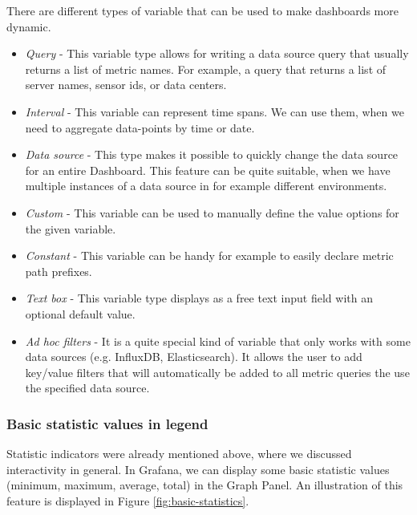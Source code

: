 
There are different types of variable that can be used to make dashboards more dynamic.
\begin{itemize}
	\item \emph{Query} - This variable type allows for writing a data source query that usually returns a list of metric names. For example, a query that returns a list of server names, sensor ids, or data centers.
	\item \emph{Interval} - This variable can represent time spans. We can use them, when we need to aggregate data-points by time or date.
	\item \emph{Data source} - This type makes it possible to quickly change the data source for an entire Dashboard. This feature can be quite suitable, when we have multiple instances of a data source in for example different environments.
	\item \emph{Custom} - This variable can be used to manually define the value options for the given variable.
	\item \emph{Constant} - This variable can be handy for example to easily declare metric path prefixes. 
	\item \emph{Text box} - This variable type displays as a free text input field with an optional default value.
	\item \emph{Ad hoc filters} - It is a quite special kind of variable that only works with some data sources (e.g. InfluxDB, Elasticsearch). It allows the user to add key/value filters that will automatically be added to all metric queries the use the specified data source.
\end{itemize}

\subsubsection{Basic statistic values in legend}

Statistic indicators were already mentioned above, where we discussed interactivity in general. In Grafana, we can display some basic statistic values (minimum, maximum, average, total) in the Graph Panel. An illustration of this feature is displayed in Figure \ref{fig:basic-statistics}.

